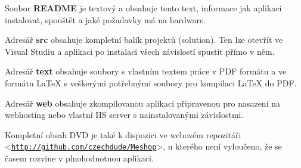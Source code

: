 \documentclass[11pt,twoside,a4paper]{book}
\let\oldUrl\url
\renewcommand\url[1]{<\texttt{\oldUrl{#1}}>}
\begin{document}
Soubor \textbf{README} je textový a obsahuje tento text, informace jak aplikaci instalovat, spouštět a jaké požadavky má na hardware.

Adresář \textbf{src} obsahuje kompletní balík projektů (solution). Ten lze otevřít ve Visual Studiu a aplikaci po instalaci všech závislostí spustit přímo v něm.

Adresář \textbf{text} obsahuje soubory s vlastním textem práce v PDF formátu a ve formátu {\LaTeX} s veškerými potřebnými soubory pro kompilaci {\LaTeX} do PDF.

Adresář \textbf{web} obsahuje zkompilovanou aplikaci připravenou pro nasazení na webhosting nebo vlastní IIS server s nainstalovanými závislostmi.

Kompletní obsah DVD je také k dispozici ve webovém repozitáři \url{http://github.com/czechdude/Meshop}, u kterého není vyloučeno, že se časem rozvine v plnohodnotnou aplikaci.
\end{document}
